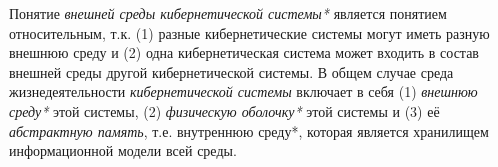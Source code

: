 Понятие \textit{внешней среды кибернетической системы*} является понятием относительным, т.к. (1) разные кибернетические системы могут иметь разную внешнюю среду и (2) одна кибернетическая система может входить в состав внешней среды другой кибернетической системы. 
В общем случае среда жизнедеятельности \textit{кибернетической системы} включает в себя (1) \textit{внешнюю среду*} этой системы, (2) \textit{физическую оболочку*} этой системы и (3) её \textit{абстрактную память}, т.е. внутреннюю среду*, которая является хранилищем информационной модели всей среды.
